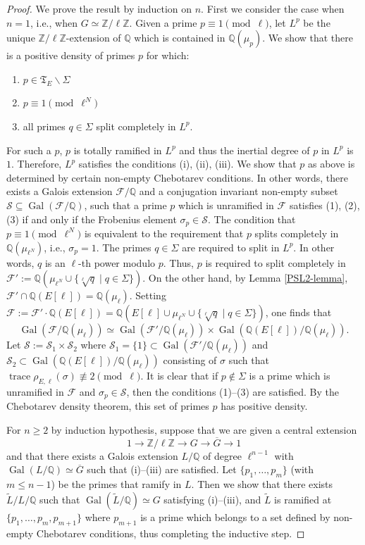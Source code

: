 \documentclass[11pt,reqno]{amsart}
\newcommand{\cF}{\mathcal{F}}
\newcommand{\Z}{\mathbb{Z}}
\newcommand{\Q}{\mathbb{Q}}
\newcommand{\op}[1]{\operatorname{#1}}
\numberwithin{equation}{section}
\begin{document}
\begin{proof}
    We prove the result by induction on $n$. First we consider the case when $n=1$, i.e., when $G\simeq \Z/\ell\Z$. Given a prime $p\equiv 1\pmod{\ell}$, let $L^p$ be the unique $\Z/\ell\Z$-extension of $\Q$ which is contained in $\Q(\mu_p)$. We show that there is a positive density of primes $p$ for which:
    \begin{enumerate}
        \item $p\in \mathfrak{T}_E\backslash \Sigma$ \item $p\equiv 1\pmod{\ell^N}$
        \item  all primes $q\in \Sigma$ split completely in $L^p$.
    \end{enumerate} 
     For such a $p$, $p$ is totally ramified in $L^p$ and thus the inertial degree of $p$ in $L^p$ is $1$. Therefore, $L^p$ satisfies the conditions (i), (ii), (iii).  We show that $p$ as above is determined by certain non-empty Chebotarev conditions. In other words, there exists a Galois extension $\mathcal{F}/\Q$ and a conjugation invariant non-empty subset $\mathcal{S}\subseteq \op{Gal}(\mathcal{F}/\Q)$, such that a prime $p$ which is unramified in $\mathcal{F}$ satisfies (1), (2), (3) if and only if the Frobenius element $\sigma_p\in \mathcal{S}$. The condition that $p\equiv 1\pmod{\ell^N}$ is equivalent to the requirement that $p$ splits completely in $\Q(\mu_{\ell^N})$, i.e., $\sigma_p=1$. The primes $q\in \Sigma$ are required to split in $L^p$. In other words, $q$ is an $\ell$-th power modulo $p$. Thus, $p$ is required to split completely in $\cF':=\Q(\mu_{\ell^N}\cup\{\sqrt[\ell]{q} \mid q\in \Sigma\})$. On the other hand, by Lemma \ref{PSL2-lemma}, $\cF'\cap \Q(E[\ell])=\Q(\mu_\ell)$. Setting $\cF:=\cF'\cdot \Q(E[\ell])=\Q(E[\ell]\cup \mu_{\ell^N}\cup\{\sqrt[\ell]{q} \mid q\in \Sigma\})$, one finds that
     \[\op{Gal}\left(\cF/\Q(\mu_\ell)\right)\simeq \op{Gal}\left(\cF'/\Q(\mu_\ell)\right)\times \op{Gal}\left(\Q(E[\ell])/\Q(\mu_\ell)\right).\] Let $\mathcal{S}:=\mathcal{S}_1\times \mathcal{S}_2$ where $\mathcal{S}_1=\{1\}\subset \op{Gal}(\cF'/\Q(\mu_\ell))$ and $\mathcal{S}_2\subset \op{Gal}(\Q(E[\ell])/\Q(\mu_\ell))$ consisting of $\sigma$ such that $\op{trace}\rho_{E,\ell}(\sigma)\not \equiv 2\pmod{\ell}$. It is clear that if $p\notin \Sigma$ is a prime which is unramified in $\cF$ and $\sigma_p\in \mathcal{S}$, then  the conditions (1)--(3) are satisfied. By the Chebotarev density theorem, this set of primes $p$ has positive density. 
    \par For $n\geq 2$ by induction hypothesis, suppose that we are given a central extension
    \[1\rightarrow \Z/\ell \Z\rightarrow G\rightarrow \overline{G}\rightarrow 1\] and that there exists a Galois extension $L/\Q$ of degree $\ell^{n-1}$ with $\op{Gal}(L/\Q)\simeq \overline{G}$ such that (i)--(iii) are satisfied. Let $\{p_1, \dots, p_m\}$ (with $m\leq n-1$) be the primes that ramify in $L$. Then we show that there exists $\widetilde{L}/L/\Q$ such that $\op{Gal}(\widetilde{L}/\Q)\simeq G$ satisfying (i)--(iii), and $\widetilde{L}$ is ramified at $\{p_1, \dots, p_m, p_{m+1}\}$ where $p_{m+1}$ is a prime which belongs to a set defined by non-empty Chebotarev conditions, thus completing the inductive step.
    

\end{proof}
\end{document}
